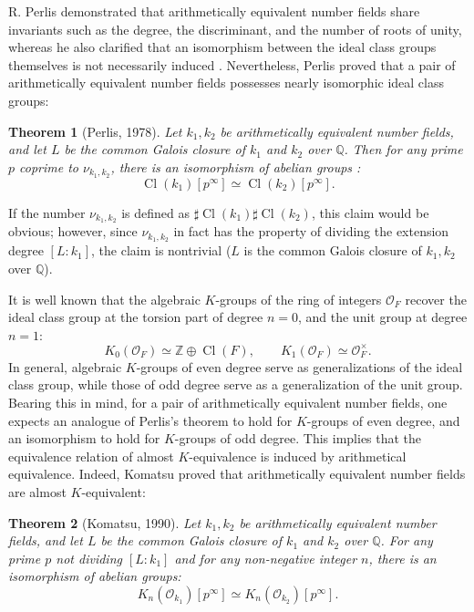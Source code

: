 \documentclass{article}
\numberwithin{equation}{section} %
\newtheorem*{them*}{Theorem}
\begin{document}
R. Perlis \cite{Perlis} demonstrated that arithmetically equivalent number fields share invariants such as the degree, the discriminant, and the number of roots of unity, whereas he also clarified that an isomorphism between the ideal class groups themselves is not necessarily induced \cite{Perlis3}. Nevertheless, Perlis proved that a pair of arithmetically equivalent number fields possesses nearly isomorphic ideal class groups:

\begin{them*}[Perlis, 1978]
  Let $k_1, k_2$ be arithmetically equivalent number fields, and let $L$ be the common Galois closure of $k_1$ and $k_2$ over $\mathbb{Q}$. Then for any prime $p$ coprime to $\nu_{k_1,k_2}$, there is an isomorphism of abelian groups \cite[Theorem 3]{Perlis2}:
  \[
    \operatorname{Cl}(k_1)[p^\infty] \simeq \operatorname{Cl}(k_2)[p^\infty].
  \]
\end{them*}

If the number $\nu_{k_1,k_2}$ is defined as $\sharp \operatorname{Cl}(k_1)\sharp \operatorname{Cl}(k_2)$, this claim would be obvious; however, since $\nu_{k_1,k_2}$ in fact has the property of dividing the extension degree $[L:k_1]$, the claim is nontrivial ($L$ is the common Galois closure of $k_1,k_2$ over $\mathbb{Q}$).

It is well known that the algebraic $K$-groups of the ring of integers $\mathcal{O}_F$ recover the ideal class group at the torsion part of degree $n=0$, and the unit group at degree $n=1$:
\[
  K_0(\mathcal{O}_F) \simeq \mathbb{Z} \oplus \operatorname{Cl}(F), \qquad K_1(\mathcal{O}_F) \simeq \mathcal{O}_F^\times.
\]
In general, algebraic $K$-groups of even degree serve as generalizations of the ideal class group, while those of odd degree serve as a generalization of the unit group. Bearing this in mind, for a pair of arithmetically equivalent number fields, one expects an analogue of Perlis's theorem to hold for $K$-groups of even degree, and an isomorphism to hold for $K$-groups of odd degree. This implies that the equivalence relation of almost $K$-equivalence is induced by arithmetical equivalence. Indeed, Komatsu\cite{Komatsu} proved that arithmetically equivalent number fields are almost $K$-equivalent:

\begin{them*}[Komatsu, 1990]
  Let $k_1, k_2$ be arithmetically equivalent number fields, and let $L$ be the common Galois closure of $k_1$ and $k_2$ over $\mathbb{Q}$. For any prime $p$ not dividing $[L:k_1]$ and for any non-negative integer $n$, there is an isomorphism of abelian groups:
  \[
    K_n(\mathcal{O}_{k_1})[p^\infty] \simeq K_n(\mathcal{O}_{k_2})[p^\infty].
  \]
\end{them*}
\end{document}
